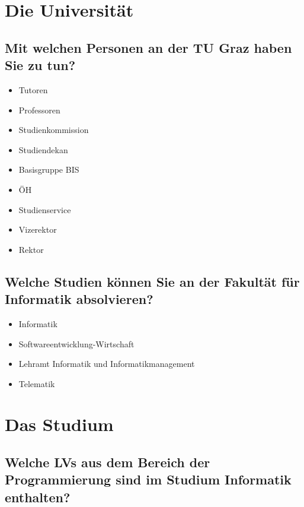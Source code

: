 
\maketitle

\section{Die Universität}

\subsection{Mit welchen Personen an der TU Graz haben Sie zu tun?}

\begin{itemize}
  \item Tutoren
  \item Professoren
  \item Studienkommission
  \item Studiendekan
  \item Basisgruppe BIS
  \item ÖH
  \item Studienservice
  \item Vizerektor
  \item Rektor
\end{itemize}

\subsection{Welche Studien können Sie an der Fakultät für Informatik absolvieren?}

\begin{itemize}
  \item Informatik
  \item Softwareentwicklung-Wirtschaft
  \item Lehramt Informatik und Informatikmanagement
  \item Telematik
\end{itemize}

\section{Das Studium}

\subsection{Welche LVs aus dem Bereich der Programmierung sind im Studium
    Informatik enthalten?}

